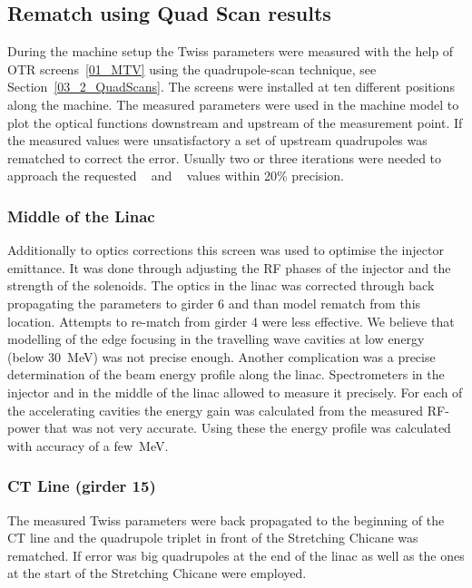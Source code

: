 \subsection{Rematch using Quad Scan results}

During the machine setup the Twiss parameters were measured with the help of OTR screens~\ref{01_MTV}
using the quadrupole-scan technique, see Section~\ref{03_2_QuadScans}. 
The screens were installed at ten different positions along the machine. 
The measured parameters were used in the machine model to plot the optical functions
downstream and upstream of the measurement point. 
If the measured values were unsatisfactory a set of upstream quadrupoles was rematched to correct the error.
Usually two or three iterations were needed to approach the requested 
\textalpha~ and \textbeta~ values within 20\% precision.



\subsubsection{Middle of the Linac }

Additionally to optics corrections this screen was used to optimise the injector emittance. 
It was done through adjusting the RF phases of the injector and the strength of the solenoids. 
The optics in the linac was corrected through back propagating the parameters to girder 6 and 
than model rematch from this location. Attempts to re-match from girder 4 were less effective. 
We believe that modelling of the edge focusing in the travelling wave cavities at low energy
(below 30~MeV) was not precise enough.
Another complication was a precise determination of the beam energy profile along the linac. 
Spectrometers in the injector and in the middle of the linac allowed to measure it precisely.  
For each of the accelerating cavities the energy gain was calculated from 
the measured RF-power that was not very accurate. 
Using these the energy profile was calculated with accuracy of a few~MeV. 

\subsubsection{CT Line (girder 15)}

The measured Twiss parameters were back propagated to the beginning of the CT line
and the quadrupole triplet in front of the Stretching Chicane was rematched.
If error was big quadrupoles at the end of the linac as well as the ones
at the start of the Stretching Chicane were employed.

